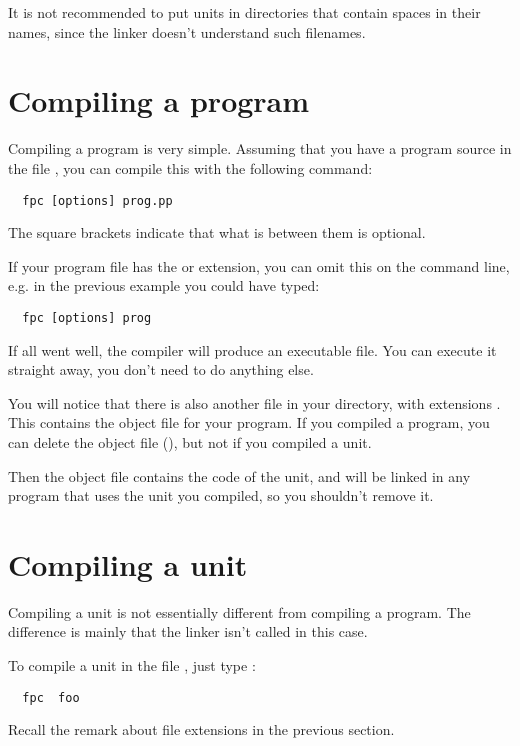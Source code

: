 It is not recommended to put units in directories that contain spaces in
their names, since the linker doesn't understand such filenames.

\section{Compiling a program}
Compiling a program is very simple. Assuming that you have a program source
in the file , you can compile this with the following command:
\begin{verbatim}
  fpc [options] prog.pp
\end{verbatim}
The square brackets \var{[\ ]} indicate that what is between them is optional.

If your program file has the  or  extension,
you can omit this on the command line, e.g. in the previous example you
could have typed:
\begin{verbatim}
  fpc [options] prog
\end{verbatim}

If all went well, the compiler will produce an executable file. You can execute 
it straight away, you don't need to do anything else. 

You will notice that there is also another file in your directory, with
extensions . This contains the object file for your program.
If you compiled a program, you can delete the object file (),
but not if you compiled a unit.

Then the object file contains the code of the unit, and will be
linked in any program that uses the unit you compiled, so you shouldn't
remove it.


\section{Compiling a unit}

Compiling a unit is not essentially different from compiling a program.
The difference is mainly that the linker isn't called in this case.

To compile a unit in the file , just type :
\begin{verbatim}
  fpc  foo
\end{verbatim}
Recall the remark about file extensions in the previous section.

